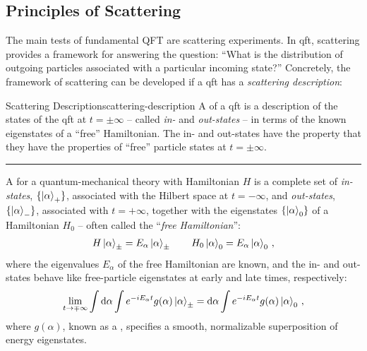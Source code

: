 \subsection{Principles of Scattering}
\label{sec:scattering}


The main tests of fundamental QFT are scattering experiments.
%
In \gls{qft}, scattering provides a framework for answering the question:
%
``What is the distribution of outgoing particles associated with a particular incoming state?''
%
Concretely, the framework of scattering can be developed if a \gls{qft} has a \textit{scattering description}:

\begin{definitionbox}{Scattering Description}{scattering-description}
    A \emph{} of a \gls{qft} is a description of the states of the \gls{qft} at \(t = \pm \infty\) -- called \textit{in-} and \textit{out-states} -- in terms of the known eigenstates of a ``free'' Hamiltonian.
    The in- and out-states have the property that they have the properties of ``free'' particle states at \(t = \pm\infty\).

    \vspace{7pt}
    \hrule
    \vspace{7pt}

    A  for a quantum-mechanical theory with Hamiltonian \(H\) is a complete set of \textit{in-states}, \(\{\ket{\alpha}_+\}\), associated with the Hilbert space at \(t = -\infty\), and \textit{out-states}, \(\{\ket{\alpha}_-\}\), associated with \(t = +\infty\), together with the eigenstates \(\{\ket{\alpha}_0\}\) of a Hamiltonian \(H_0\) -- often called the ``\textit{free Hamiltonian}'':
    \begin{align}
        H \ket{\alpha}_\pm = E_\alpha \ket{\alpha}_\pm
        \qquad
        H_0 \ket{\alpha}_0 = E_\alpha \ket{\alpha}_0
        \,,
    \end{align}
    where the eigenvalues \(E_\alpha\) of the free Hamiltonian are known, and the in- and out-states behave like free-particle eigenstates at early and late times, respectively:
    \begin{align}
        \label{eq:scattering-states}
        \lim_{t \to \mp\infty}
        \int \dd \alpha \int e^{-i E_\alpha t}
        g(\alpha) \ket{\alpha}_\pm
        =
        \dd \alpha \int e^{-i E_\alpha t}
        g(\alpha) \ket{\alpha}_0
        \,,
    \end{align}
    where \(g(\alpha)\), known as a , specifies a smooth, normalizable superposition of energy eigenstates.
\end{definitionbox}

